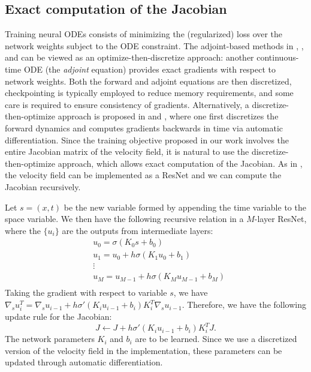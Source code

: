 \subsection{Exact computation of the Jacobian}\label{app:trainingJacobian}
Training neural ODEs consists of minimizing the (regularized) loss over the network weights subject to the ODE constraint. The adjoint-based methods in \citet{NeuralODE}, \citet{ffjord}, and \citet{HowToTrain} can be viewed as an optimize-then-discretize approach: another continuous-time ODE (the \textit{adjoint} equation) provides exact gradients with respect to network weights. Both the forward and adjoint equations are then discretized, checkpointing is typically employed to reduce memory requirements, and some care is required to ensure consistency of gradients.
%
%
Alternatively, a discretize-then-optimize approach is proposed in \citet{DiscretizeOptimize} and \citet{OTFlow}, where one first discretizes the forward dynamics and computes gradients backwards in time via automatic differentiation.
%
%
Since the training objective proposed in our work involves the entire Jacobian matrix of the velocity field, it is natural to use the discretize-then-optimize approach, which allows exact computation of the Jacobian. As in \cite{OTFlow}, the velocity field can be implemented as a ResNet and we can compute the Jacobian recursively. 

Let $s = (x,t)$ be the new variable formed by appending the time variable to the space variable. We then have the following recursive relation in a $M$-layer ResNet, where the $\{u_i\}$ are the outputs from intermediate layers:
\begin{align*}
&u_0 = \sigma(K_0s + b_0)\\
&u_1 = u_0 + h\sigma(K_1u_0 + b_1)\\
& \vdots \\
& u_M = u_{M-1} + h\sigma(K_Mu_{M-1} + b_M)\\
\end{align*}
Taking the gradient with respect to variable $s$, we have $\nabla_s u_i^T = \nabla_s u_{i-1} + h\sigma'(K_iu_{i-1} + b_i)K^T_i\nabla_s u_{i-1}$. 
Therefore, we have the following update rule for the Jacobian: $$J \leftarrow J+h\sigma'(K_iu_{i-1} + b_i)K_i^TJ.$$	
The network parameters $K_i$ and $b_i$ are to be learned. Since we use a discretized version of the velocity field in the implementation, these parameters can be updated through automatic differentiation. 